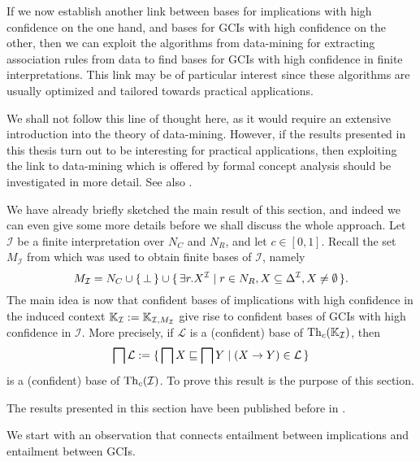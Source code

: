 If we now establish another link between bases for implications with high confidence on
the one hand, and bases for GCIs with high confidence on the other, then we can exploit
the algorithms from data-mining for extracting association rules from data to find bases
for GCIs with high confidence in finite interpretations.  This link may be of particular
interest since these algorithms are usually optimized and tailored towards practical
applications.

We shall not follow this line of thought here, as it would require an extensive
introduction into the theory of data-mining.  However, if the results presented in this
thesis turn out to be interesting for practical applications, then exploiting the link to
data-mining which is offered by formal concept analysis should be investigated in more
detail.  See also .

We have already briefly sketched the main result of this section, and indeed we can even
give some more details before we shall discuss the whole approach.  Let $\mathcal{I}$ be a
finite interpretation over $N_C$ and $N_R$, and let $c \in [0,1]$.  Recall the set
$M_{\mathcal{I}}$ from  which was used to obtain finite bases of
$\mathcal{I}$, namely
\begin{equation*}
  M_{\mathcal{I}} = N_C \cup {\ensuremath{\{\, \bot \,\}}} \cup {\ensuremath{\{\, \exists r. X^{\mathcal{I}} \mid r \in
    N_R, X \subseteq \Delta^{\mathcal{I}}, X \neq \emptyset \,\}}}.
\end{equation*}
The main idea is now that confident bases of implications with high confidence in the
induced context ${\mathbb{K}}_{\mathcal{I}} := {\mathbb{K}}_{\mathcal{I}, M_{\mathcal{I}}}$ give rise
to confident bases of GCIs with high confidence in $\mathcal{I}$.  More precisely, if
$\mathcal{L}$ is a (confident) base of $\operatorname{Th}_c({\mathbb{K}}_{\mathcal{I}})$, then
\begin{equation*}
  \bigsqcap \mathcal{L} := {\{\, \bigsqcap X \sqsubseteq \bigsqcap Y \mid (X \to Y) \in
    \mathcal{L} \,\}}
\end{equation*}
is a (confident) base of $\operatorname{Th}_c(\mathcal{I})$.  To prove this result is the purpose of
this section.

The results presented in this section have been published before in
\cite{Borchmann-LTCS-12-06}.

We start with an observation that connects entailment between implications and entailment
between GCIs.

